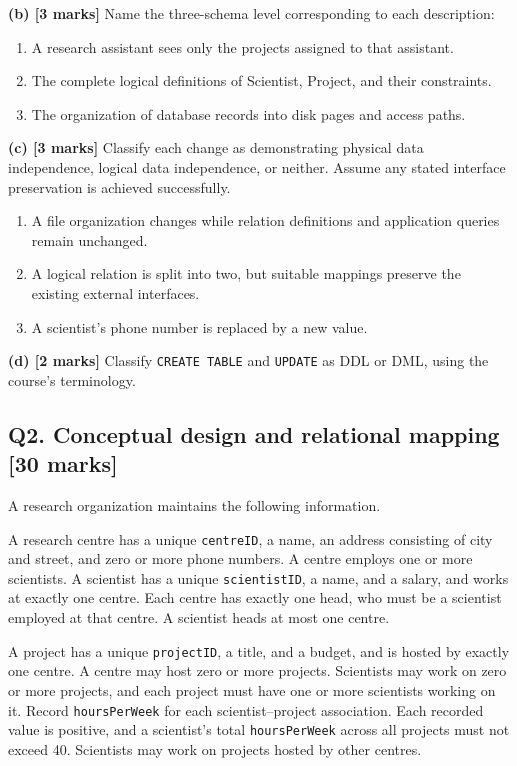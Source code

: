 \textbf{(b) {[}3 marks{]}} Name the three-schema level corresponding to each description:

\begin{enumerate}
\def\labelenumi{\arabic{enumi}.}
\tightlist
\item
  A research assistant sees only the projects assigned to that assistant.
\item
  The complete logical definitions of Scientist, Project, and their constraints.
\item
  The organization of database records into disk pages and access paths.
\end{enumerate}

\textbf{(c) {[}3 marks{]}} Classify each change as demonstrating physical data independence, logical data independence, or neither. Assume any stated interface preservation is achieved successfully.

\begin{enumerate}
\def\labelenumi{\arabic{enumi}.}
\tightlist
\item
  A file organization changes while relation definitions and application queries remain unchanged.
\item
  A logical relation is split into two, but suitable mappings preserve the existing external interfaces.
\item
  A scientist's phone number is replaced by a new value.
\end{enumerate}

\textbf{(d) {[}2 marks{]}} Classify \texttt{CREATE\ TABLE} and \texttt{UPDATE} as DDL or DML, using the course's terminology.

\subsection{Q2. Conceptual design and relational mapping {[}30 marks{]}}\label{practice_paper_1-q2.-conceptual-design-and-relational-mapping-30-marks}

A research organization maintains the following information.

A research centre has a unique \texttt{centreID}, a name, an address consisting of city and street, and zero or more phone numbers. A centre employs one or more scientists. A scientist has a unique \texttt{scientistID}, a name, and a salary, and works at exactly one centre. Each centre has exactly one head, who must be a scientist employed at that centre. A scientist heads at most one centre.

A project has a unique \texttt{projectID}, a title, and a budget, and is hosted by exactly one centre. A centre may host zero or more projects. Scientists may work on zero or more projects, and each project must have one or more scientists working on it. Record \texttt{hoursPerWeek} for each scientist--project association. Each recorded value is positive, and a scientist's total \texttt{hoursPerWeek} across all projects must not exceed 40. Scientists may work on projects hosted by other centres.

